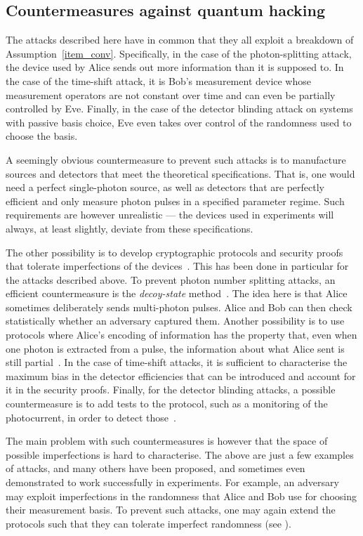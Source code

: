 \subsection{Countermeasures against quantum hacking} \label{sec:attacks:countermeasures}

The attacks described here have in common that they all exploit a breakdown of Assumption~\ref{item_conv}. Specifically, in the case of the photon-splitting attack, the device used by Alice sends out more information than it is supposed to. In the case of the time-shift attack, it is Bob's measurement device  whose measurement operators are not constant over time and can even be partially controlled by Eve. Finally, in the case of the detector blinding attack on systems with passive basis choice, Eve even takes over control of the randomness used to choose the basis.

A seemingly obvious countermeasure to prevent such attacks is to manufacture sources and detectors that meet the theoretical specifications. That is, one would need a perfect single-photon source, as well as detectors that are perfectly efficient and only measure photon pulses in a specified parameter regime. Such requirements are however unrealistic --- the devices used in experiments will always, at least slightly, deviate from these specifications. 

The other possibility is to develop cryptographic protocols and  security proofs that tolerate imperfections of the devices~\cite{GLLP04}.  This has been done in particular for the attacks described above. To prevent photon number splitting attacks, an efficient countermeasure is the \emph{decoy-state} method~\cite{Hwang2003,Wang2005,Loetal2005}. The idea here is that Alice sometimes deliberately sends multi-photon pulses. Alice and Bob can  then check statistically whether an adversary captured them. Another possibility is to use protocols where Alice's encoding of information has the property that, even when one photon is extracted from a pulse, the information about what Alice sent is still partial~\cite{SARG,TamakiLo,SYK14}. In the case of time-shift attacks, it is sufficient to characterise the maximum bias in the detector efficiencies that can be introduced and account for it in the security proofs. Finally, for the detector blinding attacks, a possible countermeasure is to add tests to the protocol, such as a monitoring of the photocurrent, in order to detect those~\cite{Yuanetal2010}.  

The main problem with such countermeasures is however that the space of possible imperfections is hard to characterise. The above are just a few examples of attacks, and many others have been proposed, and sometimes even demonstrated to work successfully in experiments. For example, an adversary may exploit imperfections in the randomness that Alice and Bob use for choosing their measurement basis. To prevent such attacks, one may again extend the protocols such that they can tolerate imperfect randomness (see ). 



